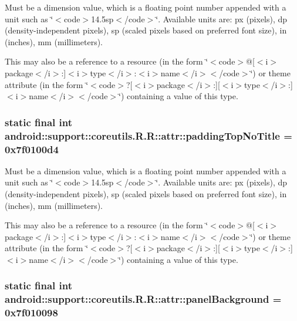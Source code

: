 Must be a dimension value, which is a floating point number appended with a unit such as \char`\"{}$<$code$>$14.5sp$<$/code$>$\char`\"{}. Available units are: px (pixels), dp (density-independent pixels), sp (scaled pixels based on preferred font size), in (inches), mm (millimeters). 

This may also be a reference to a resource (in the form \char`\"{}$<$code$>$@\mbox{[}$<$i$>$package$<$/i$>$:\mbox{]}$<$i$>$type$<$/i$>$:$<$i$>$name$<$/i$>$$<$/code$>$\char`\"{}) or theme attribute (in the form \char`\"{}$<$code$>$?\mbox{[}$<$i$>$package$<$/i$>$:\mbox{]}\mbox{[}$<$i$>$type$<$/i$>$:\mbox{]}$<$i$>$name$<$/i$>$$<$/code$>$\char`\"{}) containing a value of this type. \hypertarget{classandroid_1_1support_1_1coreutils_1_1_r_1_1attr_3375022ce81402ef6749bed7eb6dcd05}{
\subsubsection[{paddingTopNoTitle}]{\setlength{\rightskip}{0pt plus 5cm}static final int android::support::coreutils.R.R::attr::paddingTopNoTitle = 0x7f0100d4}}
\label{classandroid_1_1support_1_1coreutils_1_1_r_1_1attr_3375022ce81402ef6749bed7eb6dcd05}


Must be a dimension value, which is a floating point number appended with a unit such as \char`\"{}$<$code$>$14.5sp$<$/code$>$\char`\"{}. Available units are: px (pixels), dp (density-independent pixels), sp (scaled pixels based on preferred font size), in (inches), mm (millimeters). 

This may also be a reference to a resource (in the form \char`\"{}$<$code$>$@\mbox{[}$<$i$>$package$<$/i$>$:\mbox{]}$<$i$>$type$<$/i$>$:$<$i$>$name$<$/i$>$$<$/code$>$\char`\"{}) or theme attribute (in the form \char`\"{}$<$code$>$?\mbox{[}$<$i$>$package$<$/i$>$:\mbox{]}\mbox{[}$<$i$>$type$<$/i$>$:\mbox{]}$<$i$>$name$<$/i$>$$<$/code$>$\char`\"{}) containing a value of this type. \hypertarget{classandroid_1_1support_1_1coreutils_1_1_r_1_1attr_c9960b05ab4002f588d5b927e498ce59}{
\subsubsection[{panelBackground}]{\setlength{\rightskip}{0pt plus 5cm}static final int android::support::coreutils.R.R::attr::panelBackground = 0x7f010098}}
\label{classandroid_1_1support_1_1coreutils_1_1_r_1_1attr_c9960b05ab4002f588d5b927e498ce59}


